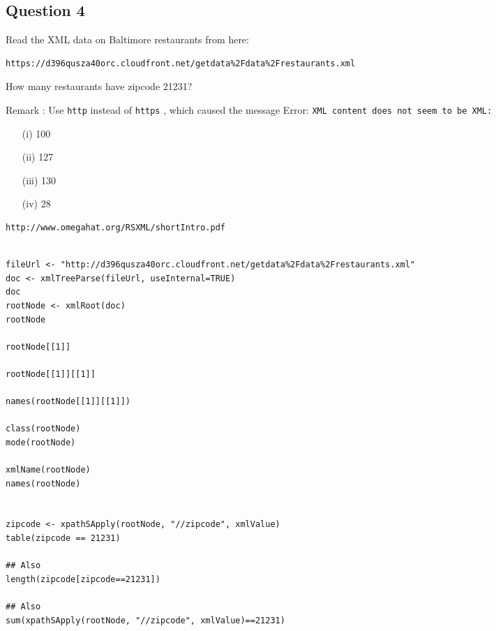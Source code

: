 \documentclass[]{article}
\begin{document}
\newpage
\subsection*{Question 4}

Read the XML data on Baltimore restaurants from here: 

\begin{verbatim}
https://d396qusza40orc.cloudfront.net/getdata%2Fdata%2Frestaurants.xml 
\end{verbatim}
How many restaurants have zipcode 21231? 

Remark : Use \texttt{http}  instead of \texttt{https} , which caused the message Error: \texttt{XML content does not 
seem to be XML: }
\begin{itemize}
\item[(i)] 100 

\item[(ii)] 127 

\item[(iii)] 130 

\item[(iv)] 28
\end{itemize}

\begin{verbatim}
http://www.omegahat.org/RSXML/shortIntro.pdf
\end{verbatim}

\newpage

\begin{framed}
\begin{verbatim}

fileUrl <- "http://d396qusza40orc.cloudfront.net/getdata%2Fdata%2Frestaurants.xml"
doc <- xmlTreeParse(fileUrl, useInternal=TRUE)
doc
rootNode <- xmlRoot(doc)
rootNode

rootNode[[1]]

rootNode[[1]][[1]]

names(rootNode[[1]][[1]])

class(rootNode)
mode(rootNode)

xmlName(rootNode)
names(rootNode)


zipcode <- xpathSApply(rootNode, "//zipcode", xmlValue)
table(zipcode == 21231)

## Also
length(zipcode[zipcode==21231])

## Also
sum(xpathSApply(rootNode, "//zipcode", xmlValue)==21231) 



\end{verbatim}
\end{framed}
\end{document}
